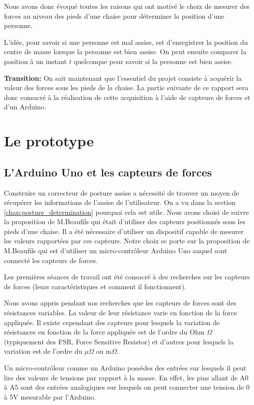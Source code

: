 \documentclass{polytech/polytech}
\begin{document}
Nous avons donc évoqué toutes les raisons qui ont motivé le choix de mesurer des forces au niveau des pieds d'une chaise pour déterminer la position d'une personne.

L'idée, pour savoir si une personne est mal assise, est d'enregistrer la position du centre de masse lorsque la personne est bien assise. On peut ensuite comparer la position à un instant $t$ quelconque pour savoir si la personne est bien assise.

\textbf{Transition:} On sait maintenant que l'essentiel du projet consiste à acquérir la valeur des forces sous les pieds de la chaise. La partie suivante de ce rapport sera donc consacré à la réalisation de cette acquisition à l'aide de capteurs de forces et d'un Arduino.

\section{Le prototype}
\label{chap:arduino}

\subsection{L'Arduino Uno et les capteurs de forces}
Construire un correcteur de posture assise a nécessité de trouver un moyen de récupérer les informations de l'assise de l'utilisateur. On a vu dans la section \ref{chap:posture_determination} pourquoi cela est utile. Nous avons choisi de suivre la proposition de M.Beaufils qui était d'utiliser des capteurs positionnés sous les pieds d'une chaise. Il a été nécessaire d'utiliser un dispositif capable de mesurer les valeurs rapportées par ces capteurs. Notre choix se porte sur la proposition de M.Beaufils qui est d'utiliser un  micro-contrôleur Arduino Uno auquel sont connecté les capteurs de forces. 

Les premières séances de travail ont été consacré à des recherches sur les capteurs de forces (leurs caractéristiques et comment il fonctionnent). 

Nous avons appris pendant nos recherches que les capteurs de forces sont des résistances variables. La valeur de leur résistance varie en fonction de la force appliquée. Il existe cependant des capteurs pour lesquels la variation de résistances en fonction de la force appliquée est de l'ordre du Ohm $\Omega$ (typiquement des FSR, Force Sensitive Resistor) et d'autres pour lesquels la variation est de l'ordre du $\mu \Omega$ ou $\mathrm{m} \Omega$.

Un micro-contrôleur comme un Arduino possèdes des entrées sur lesquels il peut lire des valeurs de tensions par rapport à la masse. En effet, les pins allant de A0 à A5 sont des entrées analogiques sur lesquels on peut connecter une tension de 0 à 5V mesurable par l'Arduino. 
\end{document}
